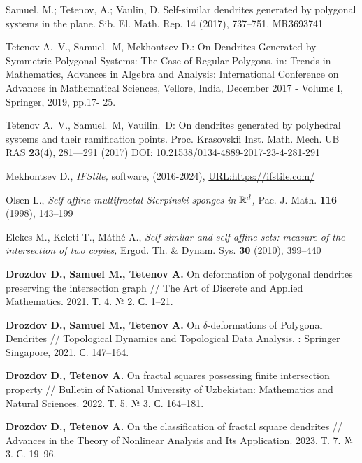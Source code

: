\begin{thebibliography}{99}
Samuel, M.; Tetenov, A.; Vaulin, D. Self-similar dendrites generated by polygonal systems in the plane. Sib. El. Math. Rep. 14 (2017), 737--751. MR3693741

Tetenov A.~V., Samuel.~M, Mekhontsev D.:
On Dendrites Generated by Symmetric 
Polygonal Systems: The Case of Regular 
Polygons. in:  Trends in Mathematics, Advances in Algebra and Analysis: International Conference on Advances in Mathematical Sciences, Vellore, India, December 2017 - Volume I,  Springer, 2019, pp.17- 25.

Tetenov A.~V., Samuel.~M, Vauilin.~D:
On dendrites generated by polyhedral systems and their ramification points.  Proc.  Krasovskii Inst. Math. Mech. UB RAS \textbf{23}(4), 281---291 (2017) DOI: 10.21538/0134-4889-2017-23-4-281-291




    {\sc Mekhontsev D.,}
    {\em IFStile,} 
    {software, (2016-2024), \href{https://ifstile.com/}{URL:https://ifstile.com/}} 

    {\sc Olsen L.,}
    {\em Self-affine multifractal Sierpinski sponges in $\mathbb{R}^d$,}
    {Pac. J. Math. \textbf{116} (1998), 143--199}

    {\sc Elekes M., Keleti T., M\'ath\'e A.,}
    {\em Self-similar and self-affine sets: measure of the intersection of two copies,}
    {Ergod. Th. \& Dynam. Sys. \textbf{30} (2010), 399--440}
    
    
\bigskip \bigskip


\bigskip \bigskip

{\bf Drozdov D., Samuel M., Tetenov A.}
On deformation of polygonal dendrites preserving the intersection graph //
The Art of Discrete and Applied Mathematics. 2021. Т. 4. № 2. С. 1--21.

{\bf Drozdov D., Samuel M., Tetenov A.} 
On $\delta$-deformations of Polygonal Dendrites // 
Topological Dynamics and Topological Data Analysis. : Springer Singapore, 2021. С. 147--164.

{\bf Drozdov D., Tetenov A.} 
On fractal squares possessing finite intersection property // 
Bulletin of National University of Uzbekistan: Mathematics and Natural Sciences. 2022. Т. 5. № 3. С. 164--181.

{\bf Drozdov D., Tetenov A.} 
On the classification of fractal square dendrites // 
Advances in the Theory of Nonlinear Analysis and Its Application. 2023. Т. 7. № 3. С. 19--96.




\end{thebibliography}